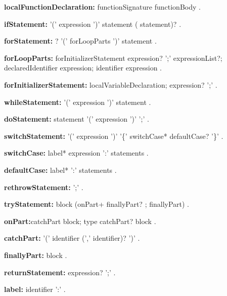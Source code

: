 \begin{grammar}
{\bf localFunctionDeclaration:}
    functionSignature functionBody
    .
\end{grammar}
\begin{grammar}
{\bf ifStatement:}
    \IF{} '(' expression ')' statement ( \ELSE{} statement)?
    .
\end{grammar}
\begin{grammar}
{\bf forStatement:}
    \AWAIT? \FOR{} '(' forLoopParts ')' statement
    .

{\bf forLoopParts:}
    forInitializerStatement expression? ';' expressionList?;
    declaredIdentifier \IN{} expression;
    identifier \IN{} expression
    .

{\bf forInitializerStatement:}
    localVariableDeclaration;
    expression? ';'
    .
\end{grammar}
\begin{grammar}
{\bf whileStatement:}
    \WHILE{} '(' expression ')' statement
    .
\end{grammar}
\begin{grammar}
{\bf doStatement:}
    \DO{} statement \WHILE{} '(' expression ')' ';'
    .
\end{grammar}
\begin{grammar}
{\bf switchStatement:}
    \SWITCH{} '(' expression ')' '\{' switchCase* defaultCase? '\}'
    .

{\bf switchCase:}
    label* \CASE{} expression ':' statements
    .

{\bf defaultCase:}
    label*  \DEFAULT{} ':' statements
    .
\end{grammar}
\begin{grammar}
{\bf rethrowStatement:}
    \RETHROW{}  ';'
    .
\end{grammar}
\begin{grammar}
{\bf tryStatement:}
    \TRY{} block (onPart+ finallyPart? ; finallyPart)
    .

{\bf onPart:}catchPart block;
    \ON{} type catchPart? block
    .

{\bf catchPart:}
    \CATCH{} '(' identifier (',' identifier)? ')' 
    .

{\bf finallyPart:}
    \FINALLY{} block
    .
\end{grammar}
\begin{grammar}
{\bf returnStatement:}
    \RETURN{} expression? ';'
    .
\end{grammar}
\begin{grammar}
{\bf label:}
    identifier ':'
    .
\end{grammar}
